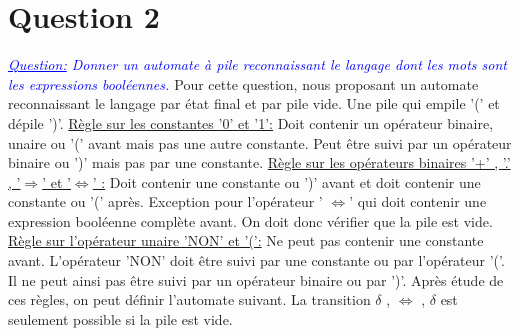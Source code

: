 \documentclass{article}
\begin{document}
\section*{Question 2}
\textit{
\textcolor{blue}{
\underline{Question:} 
Donner un automate à pile reconnaissant le langage dont les mots sont les expressions
booléennes.
}
}
\newline\newline
Pour cette question, nous proposant un automate reconnaissant le langage par état final et par pile vide. 
Une pile qui empile '(' et dépile ')'.
\newline\newline
\underline{Règle sur les constantes '0' et '1':}
Doit contenir un opérateur binaire, unaire ou '(' avant mais pas une autre constante. Peut être suivi par un opérateur binaire ou ')' mais pas par une constante. 
\newline\newline
\underline{Règle sur les opérateurs binaires '+' , '.' , '$\Rightarrow$' et '$\Leftrightarrow$' :}
Doit contenir une constante ou ')' avant et doit contenir une constante ou '(' après. Exception pour l'opérateur ' $\Leftrightarrow$' qui doit contenir une expression booléenne complète avant. On doit donc vérifier que la pile est vide. 
\newline\newline
\underline{Règle sur l'opérateur unaire 'NON' et '(':}
Ne peut pas contenir une constante avant. L'opérateur 'NON' doit être suivi par une constante ou par l'opérateur '('. Il ne peut ainsi pas être suivi par un opérateur binaire ou par ')'. 
\newline\newline
Après étude de ces règles, on peut définir l'automate suivant. La transition $\delta$ , $\Leftrightarrow$ , $\delta$ est seulement possible si la pile est vide.
\newline
\end{document}
